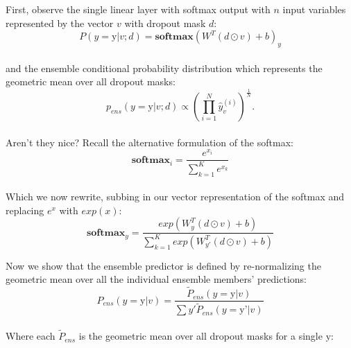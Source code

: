 \documentclass{amsart}
\theoremstyle{definition}
\theoremstyle{remark}
\numberwithin{equation}{section}
\begin{document}
First, observe the single linear layer with softmax output with $n$ input
variables represented by the vector $v$ with dropout mask $d$: \\

\begin{equation}
P(y = \mbox{y} | v;d ) = \mathbf{softmax}\left( W^T(d \odot v) + b \right)_y
\end{equation} \\

and the ensemble conditional probability distribution which represents the
geometric mean over all dropout masks: \\

\begin{equation}
p_{ens}(y = \mbox{y} | v;d ) \propto \left( \prod_{i=1}^N \hat{y}_{v}^{(i)} \right)^{\frac{1}{N}}.
\end{equation} \\

Aren't they nice? Recall the alternative formulation of the softmax: \\

\begin{equation}
\mathbf{softmax}_i = \frac{e^{x_i}}{\sum_{k=1}^K e^{x_k}}
\end{equation} \\

Which we now rewrite, subbing in our vector representation of the softmax and
replacing $e^x$ with $exp(x)$: \\

\begin{equation}
\mathbf{softmax}_y = \frac{exp \left( W_y^T(d \odot v) + b \right)}
                          {\sum_{k=1}^K exp \left( W_{y'}^T(d \odot v) + b \right)}
\end{equation}

Now we show that the ensemble predictor is defined by re-normalizing the
geometric mean over all the individual ensemble members' predictions: \\

\begin{equation}
P_{ens}(y = \mbox{y} | v) = \frac{\tilde{P}_{ens}(y = \mbox{y} | v)}{\sum{y'} \tilde{P}_{ens}(y = \mbox{y'} | v)}
\end{equation} \\

Where each $\tilde{P}_{ens}$ is the geometric mean over all dropout masks for a single $\mbox{y}$: \\
\end{document}
